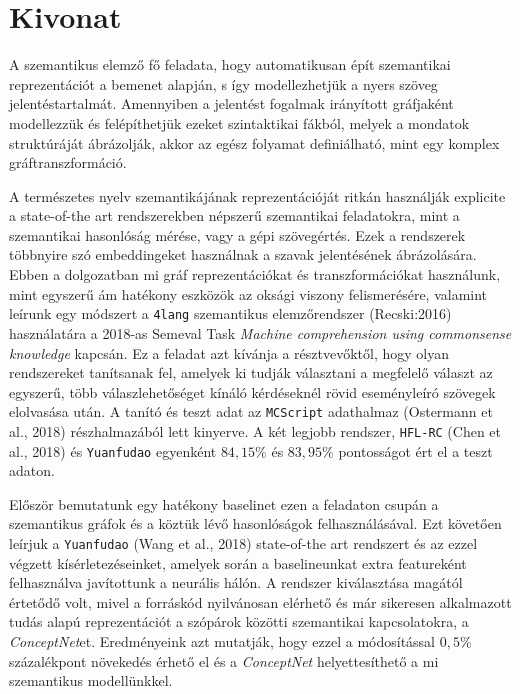 \chapter*{Kivonat}
A szemantikus elemző fő feladata, hogy automatikusan épít szemantikai reprezentációt a bemenet alapján, s így modellezhetjük a nyers szöveg jelentéstartalmát.
Amennyiben a jelentést fogalmak irányított gráfjaként modellezzük és felépíthetjük ezeket szintaktikai fákból, melyek a mondatok struktúráját ábrázolják, akkor az egész folyamat definiálható, mint egy komplex gráftranszformáció.

A természetes nyelv szemantikájának reprezentációját ritkán használják explicite a state-of-the art rendszerekben népszerű szemantikai feladatokra, mint a szemantikai hasonlóság mérése, vagy a gépi szövegértés. Ezek a rendszerek többnyire szó embeddingeket használnak a szavak jelentésének ábrázolására.
Ebben a dolgozatban mi gráf reprezentációkat és transzformációkat használunk, mint egyszerű ám hatékony eszközök az oksági viszony felismerésére, valamint leírunk egy módszert a \texttt{4lang} szemantikus elemzőrendszer (Recski:2016) használatára a 2018-as Semeval Task \textit{Machine comprehension using commonsense knowledge} kapcsán. Ez a feladat azt kívánja a résztvevőktől, hogy olyan rendszereket tanítsanak fel, amelyek ki tudják választani a megfelelő választ az egyszerű, több válaszlehetőséget kínáló kérdéseknél rövid eseményleíró szövegek elolvasása után. A tanító és teszt adat az \texttt{MCScript} adathalmaz (Ostermann et al., 2018) részhalmazából lett kinyerve.
A két legjobb rendszer, \texttt{HFL-RC} (Chen et al., 2018) és \texttt{Yuanfudao} egyenként $84,15\%$ és $83,95\%$ pontosságot ért el a teszt adaton.

Először bemutatunk egy hatékony baselinet ezen a feladaton csupán a szemantikus gráfok és a köztük lévő hasonlóságok felhasználásával. Ezt követően leírjuk a \texttt{Yuanfudao} (Wang et al., 2018) state-of-the art rendszert és az ezzel végzett kísérletezéseinket, amelyek során
a baselineunkat extra featureként felhasználva javítottunk a neurális hálón. A rendszer kiválasztása magától értetődő volt, mivel a forráskód nyilvánosan elérhető és már sikeresen alkalmazott tudás alapú reprezentációt a szópárok közötti szemantikai kapcsolatokra, a \textit{ConceptNet}et.
Eredményeink azt mutatják, hogy ezzel a módosítással $0,5\%$ százalékpont növekedés érhető el és a \textit{ConceptNet} helyettesíthető a mi szemantikus modellünkkel.
\vfill

